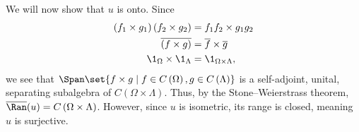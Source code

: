 \documentclass[10pt]{mypackage}
\begin{document}
\begin{example}
  We will now show that $u$ is onto. Since
  \begin{align*}
    \left(f_1\times g_1\right)\left(f_2\times g_2\right) &= f_1f_2\times g_1g_2\\
    \overline{\left(f\times g\right)} &= \overline{f}\times \overline{g}\\
    \1_{\Omega}\times\1_{\Lambda} &= \1_{\Omega\times\Lambda},
  \end{align*}
  we see that $\Span\set{f\times g\mid f\in C\left(\Omega\right),g\in C\left(\Lambda\right)}$ is a self-adjoint, unital, separating subalgebra of $C\left(\Omega\times\Lambda\right)$. Thus, by the Stone--Weierstrass theorem, $\overline{\Ran}(u) = C\left(\Omega\times\Lambda\right)$. However, since $u$ is isometric, its range is closed, meaning $u$ is surjective.
\end{example}
\end{document}
